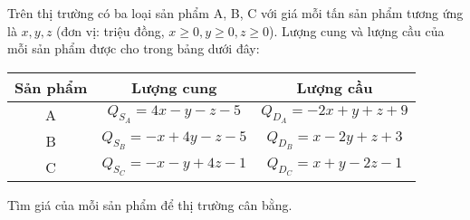 \begin{bt}
	Trên thị trường có ba loại sản phẩm A, B, C với giá mỗi tấn sản phẩm tương ứng là $x, y, z$ (đơn vị: triệu đồng, $x\ge 0, y\ge 0, z\ge 0$). Lượng cung và lượng cầu của mỗi sản phẩm được cho trong bảng dưới đây:
	\begin{center}
		\begin{tabular}{|c|c|c|}
			\hline
			Sản phẩm & Lượng cung & Lượng cầu\\ \hline
			A & $Q_{S_A}=4x-y-z-5$ & $Q_{D_A}=-2x+y+z+9$\\ \hline 
			B & $Q_{S_B}=-x+4y-z-5$ & $Q_{D_B}=x-2y+z+3$\\ \hline 
			C & $Q_{S_C}=-x-y+4z-1$ & $Q_{D_C}=x+y-2z-1$\\ \hline 	
		\end{tabular}
	\end{center}
	Tìm giá của mỗi sản phẩm để thị trường cân bằng.
\end{bt}

